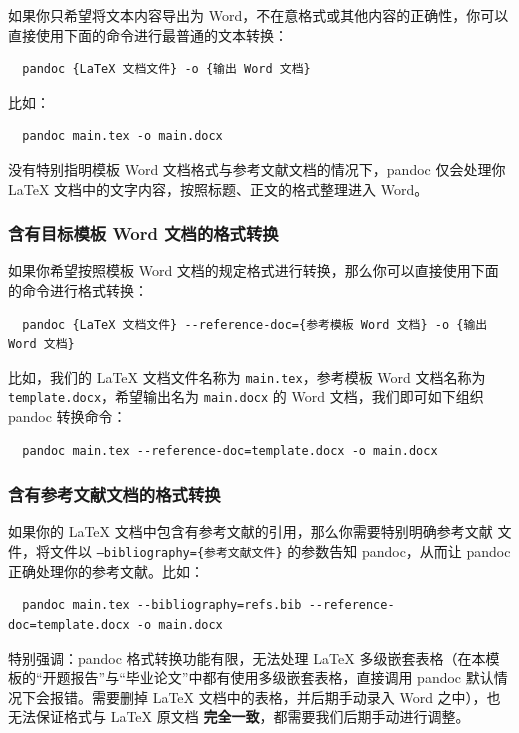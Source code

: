 如果你只希望将文本内容导出为 Word，不在意格式或其他内容的正确性，你可以直接使用下面的命令进行最普通的文本转换：

\begin{verbatim}
  pandoc {LaTeX 文档文件} -o {输出 Word 文档}
\end{verbatim}

比如：

\begin{verbatim}
  pandoc main.tex -o main.docx
\end{verbatim}

没有特别指明模板 Word 文档格式与参考文献文档的情况下，pandoc 仅会处理你 {\LaTeX} 文档中的文字内容，按照标题、正文的格式整理进入 Word。

\subsubsection{含有目标模板 Word 文档的格式转换}

如果你希望按照模板 Word 文档的规定格式进行转换，那么你可以直接使用下面的命令进行格式转换：

\begin{verbatim}
  pandoc {LaTeX 文档文件} --reference-doc={参考模板 Word 文档} -o {输出 Word 文档}
\end{verbatim}

比如，我们的 {\LaTeX} 文档文件名称为 \texttt{main.tex}，参考模板 Word 文档名称为 \texttt{template.docx}，希望输出名为 \texttt{main.docx} 的 Word 文档，我们即可如下组织 pandoc 转换命令：

\begin{verbatim}
  pandoc main.tex --reference-doc=template.docx -o main.docx
\end{verbatim}

\subsubsection{含有参考文献文档的格式转换}

如果你的 LaTeX 文档中包含有参考文献的引用，那么你需要特别明确参考文献  文件，将文件以 \texttt{--bibliography=\{参考文献文件\}} 的参数告知 pandoc，从而让 pandoc 正确处理你的参考文献。比如：

\begin{verbatim}
  pandoc main.tex --bibliography=refs.bib --reference-doc=template.docx -o main.docx
\end{verbatim}

特别强调：pandoc 格式转换功能有限，无法处理 {\LaTeX} 多级嵌套表格（在本模板的“开题报告”与“毕业论文”中都有使用多级嵌套表格，直接调用 pandoc 默认情况下会报错。需要删掉 {\LaTeX} 文档中的表格，并后期手动录入 Word 之中），也无法保证格式与 {\LaTeX} 原文档 \textbf{完全一致}，都需要我们后期手动进行调整。
